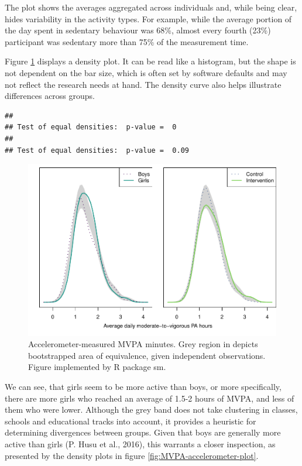 \documentclass[english,floatsintext,]{apa6}
\theoremstyle{definition}
\theoremstyle{definition}
\theoremstyle{definition}
\theoremstyle{remark}
\begin{document}
The plot shows the averages aggregated across individuals and, while
being clear, hides variability in the activity types. For example, while
the average portion of the day spent in sedentary behaviour was 68\%,
almost every fourth (23\%) participant was sedentary more than 75\% of
the measurement time.

Figure \ref{fig:MVPA-accelerometer-sm} displays a density plot. It can
be read like a histogram, but the shape is not dependent on the bar
size, which is often set by software defaults and may not reflect the
research needs at hand. The density curve also helps illustrate
differences across groups.

\begin{verbatim}
## 
## Test of equal densities:  p-value =  0
## 
## Test of equal densities:  p-value =  0.09
\end{verbatim}

\begin{figure}
\centering
\includegraphics{_baseline-manuscript_files/figure-latex/MVPA-accelerometer-sm-1.pdf}
\caption{\label{fig:MVPA-accelerometer-sm}Accelerometer-measured MVPA
minutes. Grey region in depicts bootstrapped area of equivalence, given
independent observations. Figure implemented by R package sm.}
\end{figure}

We can see, that girls seem to be more active than boys, or more
specifically, there are more girls who reached an average of 1.5-2 hours
of MVPA, and less of them who were lower. Although the grey band does
not take clustering in classes, schools and educational tracks into
account, it provides a heuristic for determining divergences between
groups. Given that boys are generally more active than girls (P. Husu et
al., 2016), this warrants a closer inspection, as presented by the
density plots in figure \ref{fig:MVPA-accelerometer-plot}.
\end{document}
